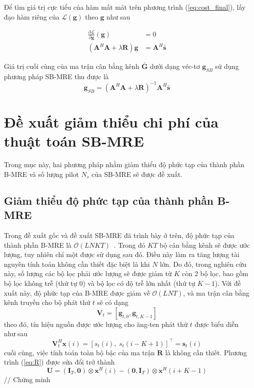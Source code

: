 Để tìm giá trị cực tiểu của hàm mất mát trên phương trình (\ref{eq:cost_final}), lấy đạo hàm riêng của $\mathcal{L}(\mathbf{g})$ theo $\mathbf{g}$ như sau 

\begin{equation}
\begin{aligned}
\frac{\partial \mathcal{L}}{\partial \mathbf{g}}(\mathbf{g}) &= 0 \\
\left(\mathbf{A}^H \mathbf{A}+\lambda \mathbf{R}\right) \mathbf{g} &= \mathbf{A}^H \bar{\mathbf{s}}
\end{aligned}
\end{equation}

Giá trị cuối cùng của ma trận cân bằng kênh $\bar{\mathbf{G}}$ dưới dạng véc-tơ $\mathbf{g}_{SB}$ sử dụng phương pháp SB-MRE thu được là
\begin{equation}
    \mathbf{g}_{SB}=\left(\mathbf{A}^H \mathbf{A} + \lambda \mathbf{R}\right)^{-1} \mathbf{A}^H \bar{\mathbf{s}}
\end{equation}

\section{Đề xuất giảm thiểu chi phí của thuật toán SB-MRE}

Trong mục này, hai phương pháp nhằm giảm thiểu độ phức tạp của thành phần B-MRE và số lượng pilot $N_s$ của SB-MRE sẽ được đề xuất.

\subsection{Giảm thiểu độ phức tạp của thành phần B-MRE}

Trong đề xuất gốc và đề xuất SB-MRE đã trình bày ở trên, độ phức tạp của thành phần B-MRE là $\mathcal{O}(LNKT)$~\cite{original}. Trong đó $KT$ bộ cân bằng kênh sẽ được ước lượng, tuy nhiên chỉ một được sử dụng sau đó. Điều này làm ra tăng lượng tài nguyên tính toán không cần thiết đặc biệt là khi $N$ lớn. Do đó, trong nghiên cứu này, số lượng các bộ lọc phải ước lượng sẽ được giảm từ $K$ còn 2 bộ lọc, bao gồm bộ lọc không trễ (thứ tự $0$) và bộ lọc có độ trễ lớn nhất (thứ tự $K-1$). Với đề xuất này, độ phức tạp của B-MRE được giảm về $\mathcal{O}(LNT)$, và ma trận cân bằng kênh truyền cho bộ phát thứ $t$ sẽ có dạng
\begin{equation}
    \mathbf{V}_{t} = [\mathbf{g}_{t, 0}, \mathbf{g}_{t, K-1}]
\end{equation}
theo đó, tín hiệu nguồn được ước lượng cho ăng-ten phát thứ $t$ được biểu diễn như sau
\begin{equation}
    \mathbf{V}_t^H \mathbf{x}(i) = [s_t(i), \; s_t(i-K+1)]^\top = \mathbf{s}_{t}(i)
\end{equation}
cuối cùng, việc tính toán toàn bộ bậc của ma trận $\mathbf{R}$ là không cần thiết. Phương trình (\ref{eq:R}) được sửa đổi trở thành
\begin{equation}
\mathbf{U} = \left(\mathbf{I}_{T}, \mathbf{0}\right) \otimes \mathbf{x}^{H}(i)-\left(\mathbf{0}, \mathbf{I}_{T}\right) \otimes \mathbf{x}^{H}(i+K-1)
\end{equation}
// Chứng minh
